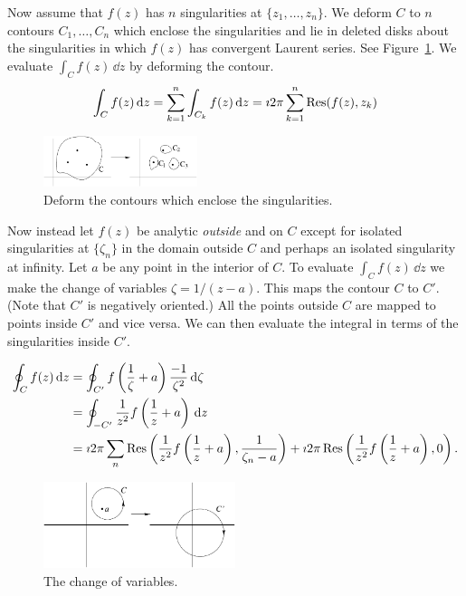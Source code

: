 Now assume that $f(z)$ has $n$ singularities at $\{ z_1, \ldots, z_n \}$.
We deform $C$ to $n$ contours $C_1, \ldots, C_n$ which enclose the singularities
and lie in deleted disks about the singularities in which $f(z)$ has 
convergent Laurent series.  See Figure~\ref{deformc2cn}.  We evaluate
$\int_C f(z) \,\dd z$ by deforming the contour.
\[
\int_C f(z) \,\mathrm{d} z 
= \sum_{k = 1}^n \int_{C_k} f(z) \,\mathrm{d} z
= \imath 2 \pi \sum_{k = 1}^n \mathop{\mathrm{Res}}\nolimits( f(z), z_k )
\]


\begin{figure}[tb!]
  \begin{center}
    \includegraphics[width=0.4\textwidth]{fcv/residue/deformc2cn}
  \end{center}
  \caption{Deform the contours which enclose the singularities.}
  \label{deformc2cn}
\end{figure}



Now instead let $f(z)$ be analytic \textit{outside} and on $C$ 
except for isolated singularities at $\{ \zeta_n \}$ in the domain outside $C$ and
perhaps an isolated singularity at infinity.
Let $a$ be any point in the interior of $C$.
To evaluate $\int_C f(z) \,\dd z$ we make the change of variables
$\zeta = 1 / (z-a)$.  This maps the contour $C$ to $C'$.  (Note that $C'$ is
negatively oriented.)  All the points outside
$C$ are mapped to points inside $C'$ and vice versa.  We can then evaluate
the integral in terms of the singularities inside $C'$.

\begin{align*}
  \oint_C f(z)\,\mathrm{d} z 
  &= \oint_{C'} f \left( \frac{1}{\zeta} + a \right) \frac{-1}{\zeta^2} \,\mathrm{d} \zeta \\
  &= \oint_{-C'} \frac{1}{z^2} f \left(\frac{1}{z} + a \right) \,\mathrm{d} z \\
  &= \imath 2 \pi \sum_n \mathop{\mathrm{Res}}\nolimits \left( \frac{1}{z^2} f \left(\frac{1}{z} + a \right), 
    \frac{1}{\zeta_n - a} \right)
  + \imath 2 \pi \mathop{\mathrm{Res}}\nolimits \left( \frac{1}{z^2} f \left(\frac{1}{z} + a \right), 0 \right).
\end{align*}


\begin{figure}[tb!]
  \begin{center}
    \includegraphics[width=0.5\textwidth]{fcv/residue/changevarz1za}
  \end{center}
  \caption{The change of variables.}
  \label{changevarz1za}
\end{figure}



